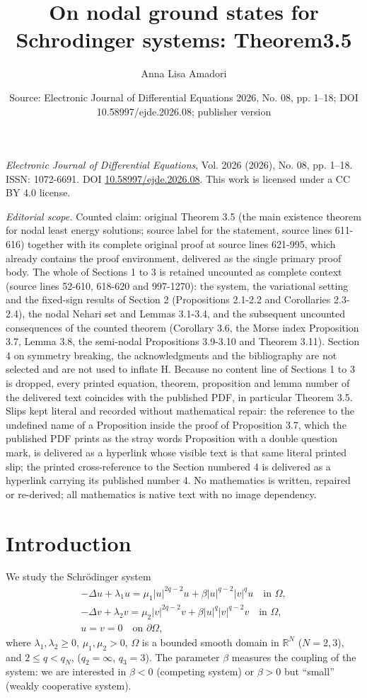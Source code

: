 \documentclass[10pt,a4paper]{amsart}
\title[On nodal ground states for Schrodinger systems]{On nodal ground states for Schrodinger systems: Theorem3.5}
\author{Anna Lisa Amadori}
\date{Source: Electronic Journal of Differential Equations 2026, No. 08, pp. 1--18; DOI 10.58997/ejde.2026.08; publisher version}
\numberwithin{equation}{section}
\begin{document}
\maketitle
\noindent\emph{Electronic Journal of Differential Equations}, Vol. 2026 (2026), No. 08, pp. 1--18.\newline
ISSN: 1072-6691. DOI \href{https://doi.org/10.58997/ejde.2026.08}{10.58997/ejde.2026.08}. This work is licensed under a CC BY 4.0 license.\par\smallskip
\noindent\textit{Editorial scope.} Counted claim: original Theorem 3.5 (the main existence theorem for nodal least energy solutions; source label for the statement, source lines 611-616) together with its complete original proof at source lines 621-995, which already contains the proof environment, delivered as the single primary proof body. The whole of Sections 1 to 3 is retained uncounted as complete context (source lines 52-610, 618-620 and 997-1270): the system, the variational setting and the fixed-sign results of Section 2 (Propositions 2.1-2.2 and Corollaries 2.3-2.4), the nodal Nehari set and Lemmas 3.1-3.4, and the subsequent uncounted consequences of the counted theorem (Corollary 3.6, the Morse index Proposition 3.7, Lemma 3.8, the semi-nodal Propositions 3.9-3.10 and Theorem 3.11). Section 4 on symmetry breaking, the acknowledgments and the bibliography are not selected and are not used to inflate H. Because no content line of Sections 1 to 3 is dropped, every printed equation, theorem, proposition and lemma number of the delivered text coincides with the published PDF, in particular Theorem 3.5. Slips kept literal and recorded without mathematical repair: the reference to the undefined name of a Proposition inside the proof of Proposition 3.7, which the published PDF prints as the stray words Proposition with a double question mark, is delivered as a hyperlink whose visible text is that same literal printed slip; the printed cross-reference to the Section numbered 4 is delivered as a hyperlink carrying its published number 4. No mathematics is written, repaired or re-derived; all mathematics is native text with no image dependency.
\section{Introduction}

We study the Schr\"odinger system
\begin{equation}\label{S}
 \begin{gathered}
 -\Delta u +\lambda_1 u= \mu_1 |u|^{2q-2} u +\beta |u|^{q-2}|v|^q u \quad
  \text{in } \Omega , \\
 -\Delta v +\lambda_2 v= \mu_2 |v|^{2q-2} v +\beta |u|^{q}|v|^{q-2} v \quad
  \text{in } \Omega ,\\
  u=v=0 \quad \text{on } \partial\Omega,
 \end{gathered}
\end{equation}
where $\lambda_1,\lambda_2\ge 0$, $\mu_1,\mu_2>0$, $\Omega$ is a bounded smooth domain
in $\mathbb{R}^N$ ($N=2,3$), and  $2\le q<q_N$, ($q_2=\infty$, $q_3=3$).
The parameter $\beta$ measures the coupling of the system: we are interested in
$\beta<0$ (competing system) or $\beta >0$ but ``small''
 (weakly cooperative system).
\end{document}
